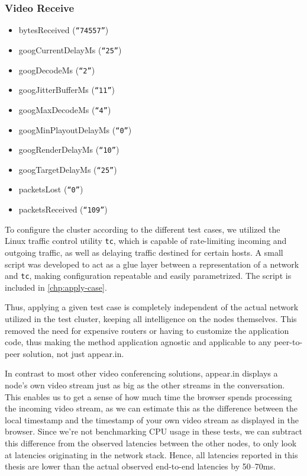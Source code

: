 \subsubsection{Video Receive}
\begin{itemize}
    \item bytesReceived (\texttt{``74557''})
    \item googCurrentDelayMs (\texttt{``25''})
    \item googDecodeMs (\texttt{``2''})
    \item googJitterBufferMs (\texttt{``11''})
    \item googMaxDecodeMs (\texttt{``4''})
    \item googMinPlayoutDelayMs (\texttt{``0''})
    \item googRenderDelayMs (\texttt{``10''})
    \item googTargetDelayMs (\texttt{``25''})
    \item packetsLost (\texttt{``0''})
    \item packetsReceived (\texttt{``109''})
\end{itemize}

To configure the cluster according to the different test cases, we utilized the Linux traffic control utility \texttt{tc}, which is capable of rate-limiting incoming and outgoing traffic, as well as delaying traffic destined for certain hosts. A small script was developed to act as a glue layer between a representation of a network and \texttt{tc}, making configuration repeatable and easily parametrized. The script is included in \autoref{chp:apply-case}.

Thus, applying a given test case is completely independent of the actual network utilized in the test cluster, keeping all intelligence on the nodes themselves. This removed the need for expensive routers or having to customize the application code, thus making the method application agnostic and applicable to any peer-to-peer solution, not just appear.in.

In contrast to most other video conferencing solutions, appear.in displays a node's own video stream just as big as the other streams in the conversation. This enables us to get a sense of how much time the browser spends processing the incoming video stream, as we can estimate this as the difference between the local timestamp and the timestamp of your own video stream as displayed in the browser. Since we're not benchmarking CPU usage in these tests, we can subtract this difference from the observed latencies between the other nodes, to only look at latencies originating in the network stack. Hence, all latencies reported in this thesis are lower than the actual observed end-to-end latencies by 50--70ms.

